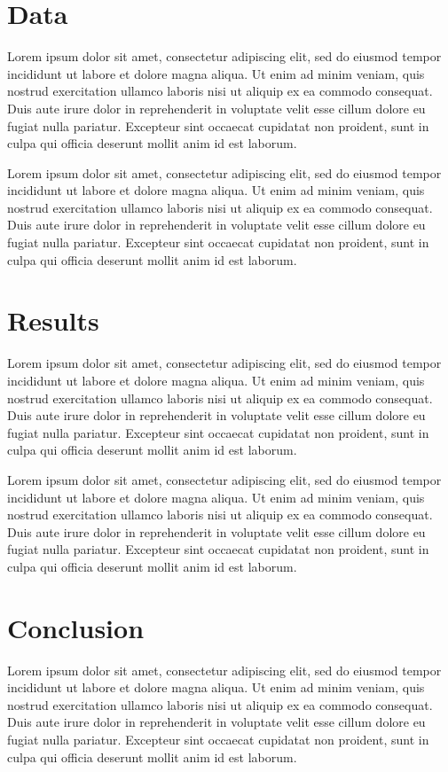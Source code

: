 \documentclass[12pt]{article}
\begin{document}
\begin{spacing}{1.4}
\section{Data} 
\label{Sec:Data}

Lorem ipsum dolor sit amet, consectetur adipiscing elit, sed do eiusmod tempor incididunt ut labore et dolore magna aliqua. Ut enim ad minim veniam, quis nostrud exercitation ullamco laboris nisi ut aliquip ex ea commodo consequat. Duis aute irure dolor in reprehenderit in voluptate velit esse cillum dolore eu fugiat nulla pariatur. Excepteur sint occaecat cupidatat non proident, sunt in culpa qui officia deserunt mollit anim id est laborum.

Lorem ipsum dolor sit amet, consectetur adipiscing elit, sed do eiusmod tempor incididunt ut labore et dolore magna aliqua. Ut enim ad minim veniam, quis nostrud exercitation ullamco laboris nisi ut aliquip ex ea commodo consequat. Duis aute irure dolor in reprehenderit in voluptate velit esse cillum dolore eu fugiat nulla pariatur. Excepteur sint occaecat cupidatat non proident, sunt in culpa qui officia deserunt mollit anim id est laborum.

\section{Results} 
\label{Sec:Results}

Lorem ipsum dolor sit amet, consectetur adipiscing elit, sed do eiusmod tempor incididunt ut labore et dolore magna aliqua. Ut enim ad minim veniam, quis nostrud exercitation ullamco laboris nisi ut aliquip ex ea commodo consequat. Duis aute irure dolor in reprehenderit in voluptate velit esse cillum dolore eu fugiat nulla pariatur. Excepteur sint occaecat cupidatat non proident, sunt in culpa qui officia deserunt mollit anim id est laborum.

Lorem ipsum dolor sit amet, consectetur adipiscing elit, sed do eiusmod tempor incididunt ut labore et dolore magna aliqua. Ut enim ad minim veniam, quis nostrud exercitation ullamco laboris nisi ut aliquip ex ea commodo consequat. Duis aute irure dolor in reprehenderit in voluptate velit esse cillum dolore eu fugiat nulla pariatur. Excepteur sint occaecat cupidatat non proident, sunt in culpa qui officia deserunt mollit anim id est laborum.

\section{Conclusion}
\label{Sec:Conclusion}

Lorem ipsum dolor sit amet, consectetur adipiscing elit, sed do eiusmod tempor incididunt ut labore et dolore magna aliqua. Ut enim ad minim veniam, quis nostrud exercitation ullamco laboris nisi ut aliquip ex ea commodo consequat. Duis aute irure dolor in reprehenderit in voluptate velit esse cillum dolore eu fugiat nulla pariatur. Excepteur sint occaecat cupidatat non proident, sunt in culpa qui officia deserunt mollit anim id est laborum.

\end{spacing}
\end{document}
